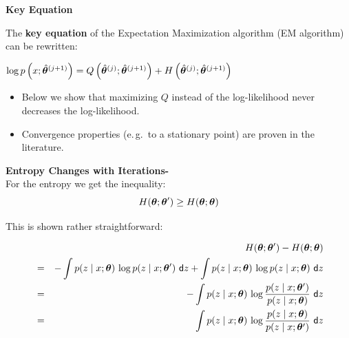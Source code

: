   \textbf{Key Equation}
  
  The   \textbf{key equation} of the Expectation Maximization algorithm (EM algorithm) can be rewritten:

  \begin{center}
        $\log p\left( x; \hat{\bm{\theta}}^{(j+1)} \right) = 
        Q\left( \hat{\bm{\theta}}^{(j)}; \hat{\bm{\theta}}^{(j+1)} \right) + 
        H\left( \hat{\bm{\theta}}^{(j)}; \hat{\bm{\theta}}^{(j+1)} \right)$
  \end{center}
  \vspace{0.5\baselineskip}
  \begin{itemize}
    \item Below we show that maximizing $Q$ instead of the log-likelihood never decreases the log-likelihood.      
    \item Convergence properties (e.\,g.\ to a stationary point) are proven in the literature.
  \end{itemize}

 \textbf{Entropy Changes with Iterations-}\\
  For the entropy we get the inequality:
  \begin{displaymath}
    H(\bm{\theta};\bm{\theta}') \geq H(\bm{\theta}; \bm{\theta})  
  \end{displaymath}

  This is shown rather straightforward:

  \begin{eqnarray*}
    & & \hspace{-1cm}H({\p};{\p'}) - H(\p;{\p}) \\   
    &=& - \int p(z\mid x;\p) \, \log p(z\mid x;{\p}')\ \mathsf{d}z
        + \int p(z\mid x;\p) \, \log p(z\mid x;{\p})\ \mathsf{d}z \\   
    &=& - \int p(z\mid x;\p) \, \log \frac{p(z\mid x;{\p}')}{p(z\mid x;{\p})}\ \mathsf{d}z \\   
    &=&   \int p(z\mid x;\p) \, \log \frac{p(z\mid x;{\p})}{p(z\mid x;{\p'})}\ \mathsf{d}z
  \end{eqnarray*}

